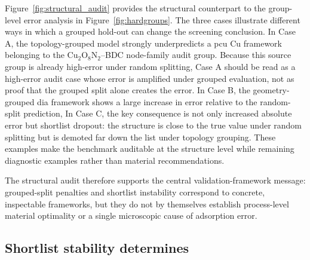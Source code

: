 \documentclass[11pt,a4paper]{article}
\newcommand{\del}[1]{}
\begin{document}
Figure~\ref{fig:structural_audit} provides the structural counterpart to the group-level error analysis in Figure~\ref{fig:hardgroups}. The three cases illustrate different ways in which a grouped hold-out can change the screening conclusion. In Case A, the topology-grouped model strongly underpredicts a pcu Cu framework belonging to the Cu$_2$O$_8$N$_2$--BDC node-family audit group. Because this source group is already high-error under random splitting, Case A should be read as a high-error audit case whose error is amplified under grouped evaluation, not as proof that the grouped split alone creates the error. In Case B, the geometry-grouped dia framework shows a large increase in error relative to the random-split prediction,  In Case C, the key consequence is not only increased absolute error but shortlist dropout: the structure is close to the true value under random splitting but is demoted far down the list under topology grouping. These examples make the benchmark auditable at the structure level while remaining diagnostic examples rather than material recommendations.

The structural audit therefore supports the central validation-framework message: grouped-split penalties and shortlist instability correspond to concrete, inspectable frameworks, but they do not by themselves establish process-level material optimality or a single microscopic cause of adsorption error.


\subsection*{Shortlist stability determines \del{screening actionability}}
\end{document}
